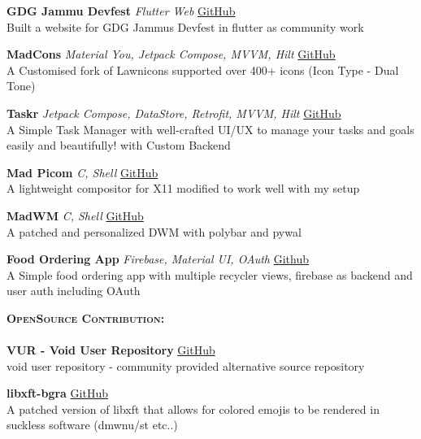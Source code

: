 \documentclass[a4paper]{article}
\newcommand{\lineunder} {
    \vspace*{-8pt} \\
    \hspace*{-18pt} \hrulefill \\
}
\newcommand{\header} [1] {
    {\hspace*{-18pt}\vspace*{6pt} \textsc{#1} }
    \vspace*{-6pt} \lineunder
}
\begin{document}
{\textbf{GDG Jammu Devfest}} {\sl Flutter Web}
    \hfill \href{https://github.com/GDG-Jammu}{GitHub}\\
    Built a website for GDG Jammu\textquotesingle{}s Devfest in flutter as community work\\
\vspace*{2mm}

{\textbf{MadCons}} {\sl Material You, Jetpack Compose, MVVM, Hilt} 
    \hfill \href{https://github.com/MadFlasheroo7/madcons}{GitHub}\\
    A Customised fork of Lawnicons supported over 400+ icons (Icon Type - Dual Tone)\\
\vspace*{2mm}

{\textbf{Taskr}} {\sl Jetpack Compose, DataStore, Retrofit, MVVM, Hilt} 
    \hfill \href{https://github.com/taskr-org}{GitHub}\\
    A Simple Task Manager with well-crafted UI/UX to manage your tasks and goals easily and beautifully! with Custom Backend\\
\vspace*{2mm}

{\textbf{Mad Picom}} {\sl C, Shell} 
    \hfill \href{https://github.com/MadFlasheroo7/mad-picom}{GitHub}\\
    A lightweight compositor for X11 modified to work well with my setup\\
\vspace*{2mm}

{\textbf{MadWM}} {\sl C, Shell} 
    \hfill \href{https://github.com/MadFlasheroo7/madwm}{GitHub}\\
    A patched and personalized DWM with polybar and pywal\\
\vspace*{2mm}

{\textbf{Food Ordering App}} {\sl Firebase, Material UI, OAuth} 
    \hfill \href{https://github.com/MadFlasheroo7/Cloud\_Backend}{Github}\\
    A Simple food ordering app with multiple recycler views, firebase as backend and user auth including OAuth\\
\vspace*{2mm}

\header{\textbf{OpenSource Contribution:}}
\textbf{VUR - Void User Repository} 
    \hfill \href{https://github.com/MadFlasheroo7/VUR}{GitHub}\\
    void user repository - community provided alternative source repository\\
\vspace*{2mm}

\textbf{libxft-bgra} 
    \hfill \href{https://github.com/MadFlasheroo7/libxft-bgra}{GitHub}\\
    A patched version of libxft that allows for colored emojis to be rendered in suckless software (dmwnu/st etc..)\\
\vspace*{2mm}
\end{document}
